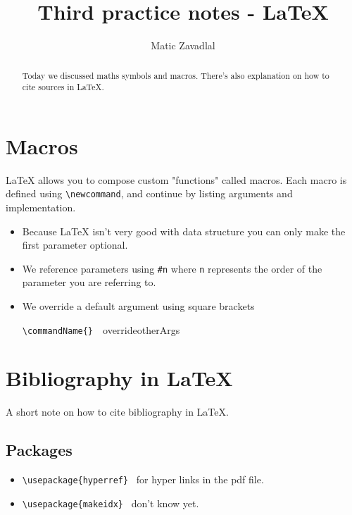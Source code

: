 \documentclass{article}
\newcommand{\command}[1]{
    \commandTwo{#1}{}\
}
\newcommand{\commandTwo}[2]{
    \texttt{\textbackslash{}#1\{#2\}}\
}
\newcommand{\package}[1]{
    \commandTwo{usepackage}{#1}
}
\begin{document}
\title{Third practice notes - \LaTeX{}}
\author{Matic Zavadlal}

\maketitle

\begin{abstract}
   Today we discussed maths symbols and macros. There's also explanation on how to cite sources in \LaTeX{}. 
\end{abstract}

\section{Macros}

\LaTeX{} allows you to compose custom "functions" called macros.
Each macro is defined using \texttt{\textbackslash{}newcommand}, and continue by listing arguments and implementation.

\begin{itemize}
    \item Because \LaTeX{} isn't very good with data structure you can only make the first parameter optional.
    \item We reference parameters using \texttt{\#n} where \texttt{n} represents the order of the parameter you are referring to.
    \item We override a default argument using square brackets \newline
            \command{commandName}{override}{otherArgs}
  
\end{itemize}

\section{Bibliography in \LaTeX{}}

A short note on how to cite bibliography in \LaTeX{}.

\subsection{Packages}

\begin{itemize}
    \item \package{hyperref} for hyper links in the pdf file.
    \item \package{makeidx} don't know yet.
\end{itemize}
\end{document}
